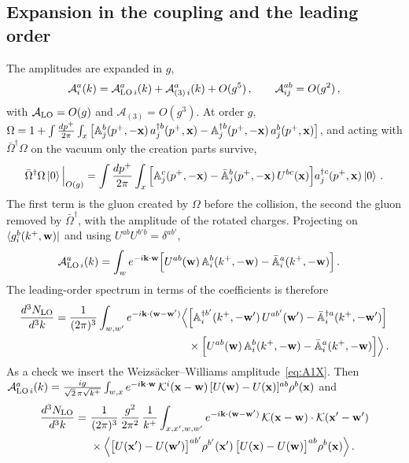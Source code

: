 \subsection{Expansion in the coupling and the leading order}\label{sec:LO}

The amplitudes are expanded in $g$,
\begin{align}\label{eq:ampexp}
\mathcal A^a_i(k)=\mathcal A^{a}_{{\rm LO}\,i}(k)+\mathcal A^a_{(3)\,i}(k)+O(g^5)\,,\qquad \mathcal A^{ab}_{ij}=O(g^2)\,,
\end{align}
with $\mathcal A_{\rm LO}=O(g)$ and $\mathcal A_{(3)}=O(g^3)$. At order $g$, $\Omega=1+\int\frac{dp^+}{2\pi}\int_x\big[\mathbb{A}^b_j(p^+,-\mathbf{x})\,a^{\dagger b}_j(p^+,\mathbf{x})-\mathbb{A}^{\dagger b}_j(p^+,-\mathbf{x})\,a^b_j(p^+,\mathbf{x})\big]$, and acting with $\bar\Omega^\dagger\Omega$ on the vacuum only the creation parts survive,
\begin{align}\label{eq:LOstate}
\bar\Omega^\dagger\Omega\ket0\Big|_{O(g)}=\int\frac{dp^+}{2\pi}\int_x\Big[\mathbb{A}^c_j(p^+,-\mathbf{x})-\bar{\mathbb{A}}^b_j(p^+,-\mathbf{x})\,U^{bc}(\mathbf{x})\Big]a^{\dagger c}_j(p^+,\mathbf{x})\ket0\,.
\end{align}
The first term is the gluon created by $\Omega$ before the collision, the second the gluon removed by $\bar\Omega^\dagger$, with the amplitude of the rotated charges. Projecting on $\bra{g^b_i(k^+,\mathbf{w})}$ and using $U^{ab}U^{b'b}=\delta^{ab'}$,
\begin{align}\label{eq:ALO}
\mathcal A^{a}_{{\rm LO}\,i}(k)&=\int_{w}e^{-i\mathbf{k}\cdot\mathbf{w}}\Big[U^{ab}(\mathbf{w})\,\mathbb{A}^b_i(k^+,-\mathbf{w})-\bar{\mathbb{A}}^a_i(k^+,-\mathbf{w})\Big]\,.
\end{align}
The leading-order spectrum in terms of the coefficients is therefore
\begin{align}\label{eq:LOcoeff}
\frac{d^3N_{\rm LO}}{d^3k}=\frac{1}{(2\pi)^3}\int_{w,w'}e^{-i\mathbf{k}\cdot(\mathbf{w}-\mathbf{w}')}\Big\langle&\Big[\mathbb{A}^{\dagger b'}_i(k^+,-\mathbf{w}')\,U^{ab'}(\mathbf{w}')-\bar{\mathbb{A}}^{\dagger a}_i(k^+,-\mathbf{w}')\Big]\notag\\
&\times\Big[U^{ab}(\mathbf{w})\,\mathbb{A}^b_i(k^+,-\mathbf{w})-\bar{\mathbb{A}}^a_i(k^+,-\mathbf{w})\Big]\Big\rangle\,.
\end{align}
As a check we insert the Weizs\"acker--Williams amplitude~\eqref{eq:A1X}. Then $\mathcal A^{a}_{{\rm LO}\,i}(k)=\frac{ig}{\sqrt2\,\pi\sqrt{k^+}}\int_{w,x}e^{-i\mathbf{k}\cdot\mathbf{w}}\,\mathcal{K}^i(\mathbf{x}-\mathbf{w})\,[U(\mathbf{w})-U(\mathbf{x})]^{ab}\rho^b(\mathbf{x})$ and
\begin{align}\label{eq:LO}
\frac{d^3N_{\rm LO}}{d^3k}=\ &\frac{1}{(2\pi)^3}\,\frac{g^2}{2\pi^2}\,\frac{1}{k^+}\int_{x,x',w,w'}e^{-i\v k\cdot(\v w-\v w')}\,
\Kv(\v x-\v w)\cdot\Kv(\v x'-\v w')
\notag\\&\times
\Big\langle\big[U(\v x')-U(\v w')\big]^{ab'}\rho^{b'}(\v x')\,\big[U(\v x)-U(\v w)\big]^{ab}\rho^{b}(\v x)\Big\rangle\,.
\end{align}
